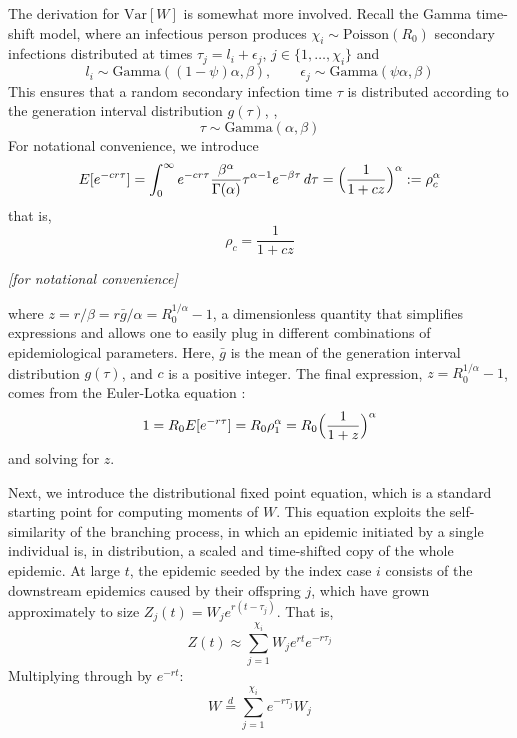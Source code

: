  The derivation for $\text{Var}[W]$ is somewhat more involved. Recall the Gamma time-shift model, where an infectious person produces $\chi_i \sim \text{Poisson}(R_0)$ secondary infections distributed at times $\tau_j = l_i+ \epsilon_j,\, j\in \{1, \dots, \chi_i\}$ and 
\begin{equation}
l_i \sim \text{Gamma}((1-\psi) \alpha, \beta), \qquad \epsilon_j \sim \text{Gamma}(\psi \alpha, \beta)
\end{equation}
This ensures that a random secondary infection time $\tau$ is distributed according to the generation interval distribution $g(\tau)$, \ie,
\begin{equation}
	\tau \sim \text{Gamma}(\alpha, \beta)
\end{equation}
For notational convenience, we introduce 
\begin{equation}
	E[e^{-c r \tau}] = \int_0^\infty e^{-cr\tau} \frac{\beta^\alpha}{\Gamma(\alpha)} \tau^{\alpha-1} e^{-\beta \tau}\, d\tau
	 = \Bigl(\frac{1}{1 + cz}\Bigr)^\alpha := \rho_c^\alpha
\end{equation}
that is, 
\begin{equation}
\boxed{\rho_c = \frac{1}{1+cz}}
\end{equation}
\begin{center}
{\it [for notational convenience]} \\ 
\end{center}
where $z = r/\beta = r \bar{g} / \alpha = R_0^{1/\alpha} - 1$, a dimensionless quantity that simplifies expressions and allows one to easily plug in different combinations of epidemiological parameters. Here, $\bar{g}$ is the mean of the generation interval distribution $g(\tau)$, and $c$ is a positive integer. The final expression, $z = R_0^{1/\alpha} - 1$, comes from the Euler-Lotka equation \citep{wallinga_how_2007}: 
\begin{equation}
1 = R_0 E[e^{-r \tau}] = R_0 \rho_1^\alpha 
= R_0 \Bigl(\frac{1}{1+z}\Bigr)^\alpha
\label{eq:euler_lotka}
\end{equation}
and solving for $z$. 


Next, we introduce the distributional fixed point equation, which is a standard starting point for computing moments of $W$. This equation exploits the self-similarity of the branching process, in which an epidemic initiated by a single individual is, in distribution, a scaled and time-shifted copy of the whole epidemic. At large $t$, the epidemic seeded by the index case $i$ consists of the downstream epidemics caused by their offspring $j$, which have grown approximately to size $Z_j(t) = W_j e^{r(t - \tau_j)}$. That is, 
%
\[
	Z(t) \approx \sum_{j=1}^{\chi_i} W_j e^{rt} e^{-r \tau_j}
\]
Multiplying through by $e^{-rt}$: 
%
\[  W \overset{d}{=} \sum_{j=1}^{\chi_i} e^{-r \tau_j} W_j \]

